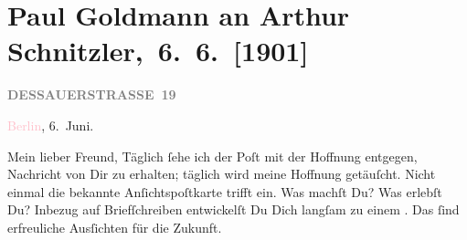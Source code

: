 

\renewcommand{\erwaehntePersonen}{Personen: Richard Beer-Hofmann, Olga Schnitzler}
\renewcommand{\erwaehnteOrte}{Orte: Berlin, Dessauer Straße, Hinterbrühl, Wien}
\renewcommand{\erwaehnteWerke}{}
\section[ Paul Goldmann an Arthur Schnitzler, 6. 6. {[}1901{]}]{Paul Goldmann an Arthur Schnitzler, 6. 6. {[}1901{]}}
\nopagebreak{}
\rehead{ }\normalsize\beginnumbering{}
\toendnotes[C]{\smallbreak\pagebreak[2]}
\toendnotes[C]{\smallbreak}
\pstart
           \noindent{}\raggedleft{}{\pb}\textcolor{pink}{\textcolor{gray}{\textbf{DESSAUERSTRASSE 19}}}{}\ledrightnote{\textcolor{pink}{Dessauer Straße}}\pend
           
\pstart
           \textcolor{pink}{Berlin}{}\ledrightnote{\textcolor{pink}{Berlin}}, 6. Juni.\pend
           
\pstart{}Mein lieber Freund,\pend
\pstart
           Täglich ſehe ich der Poſt mit der Hoffnung entgegen, Nachricht von Dir zu erhalten;
               täglich wird meine Hoffnung getäuſcht. Nicht einmal die bekannte Anſichtspoſtkarte
               trifft ein. \label{K_L03068-1v}\label{K_L03068-1h} Was machſt Du? Was erlebſt Du? Inbezug auf
               Briefſchreiben entwickelſt {\pb}Du Dich
               langſam zu einem \label{K_L03068-2v}\label{K_L03068-2h}. Das ſind erfreuliche Ausſichten für die Zukunft.\pend
           
